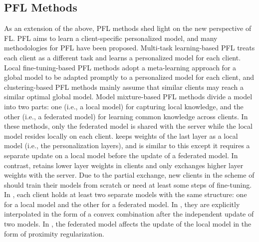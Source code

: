 \documentclass[sigconf]{acmart}
\begin{document}
\subsection{PFL Methods} As an extension of the above, PFL methods shed light on the new perspective of FL. PFL aims to learn a client-specific personalized model, and many methodologies for PFL have been proposed.
Multi-task learning-based PFL \cite{mocha, fedu, mar+21} treats each client as a different task and learns a personalized model for each client. Local fine-tuning-based PFL methods \cite{jiang+19, Fallah} adopt a meta-learning approach for a global model to be adapted promptly to a personalized model for each client, and clustering-based PFL methods \cite{ghosh+20, clustered, mansour+20} mainly assume that similar clients may reach a similar optimal global model. Model mixture-based PFL methods \cite{apfl, FedPer, lgfedavg, mansour+20, pfedme, fedrep, ditto, l2sgd} divide a model into two parts: one (i.e., a local model) for capturing local knowledge, and the other (i.e., a federated model) for learning common knowledge across clients. In these methods, only the federated model is shared with the server while the local model resides locally on each client. \cite{FedPer} keeps weights of the last layer as a local model (i.e., the personalization layers), and \cite{fedrep} is similar to this except it requires a separate update on a local model before the update of a federated model. In contrast, \cite{lgfedavg} retains lower layer weights in clients and only exchanges higher layer weights with the server. Due to the partial exchange, new clients in the scheme of \cite{FedPer, fedrep, lgfedavg} should train their models from scratch or need at least some steps of fine-tuning. In \cite{mansour+20, apfl, l2sgd, ditto, pfedme}, each client holds at least two separate models with the same structure:   one for a local model and the other for a federated model. In \cite{mansour+20, apfl,l2sgd}, they are explicitly interpolated in the form of a convex combination after the independent update of two models. In \cite{ditto, pfedme}, the federated model affects the update of the local model in the form of proximity regularization.
\end{document}
